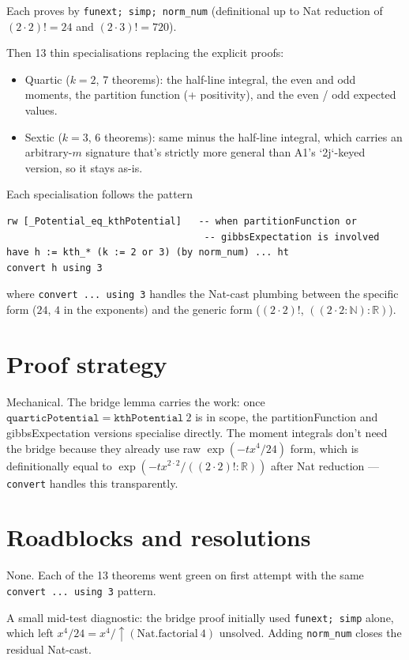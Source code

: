 \documentclass[11pt]{article}
\begin{document}
Each proves by \texttt{funext; simp; norm\_num} (definitional up to
Nat reduction of $(2 \cdot 2)! = 24$ and $(2 \cdot 3)! = 720$).

Then 13 thin specialisations replacing the explicit proofs:

\begin{itemize}[leftmargin=1.5em]
\item Quartic ($k = 2$, 7 theorems): the half-line integral, the
  even and odd moments, the partition function (+ positivity), and
  the even / odd expected values.
\item Sextic ($k = 3$, 6 theorems): same minus the half-line
  integral, which carries an arbitrary-$m$ signature that's strictly
  more general than A1's `2j`-keyed version, so it stays as-is.
\end{itemize}

Each specialisation follows the pattern
\begin{verbatim}
rw [_Potential_eq_kthPotential]   -- when partitionFunction or
                                   -- gibbsExpectation is involved
have h := kth_* (k := 2 or 3) (by norm_num) ... ht
convert h using 3
\end{verbatim}
where \texttt{convert ... using 3} handles the Nat-cast plumbing
between the specific form ($24$, $4$ in the exponents) and the
generic form ($(2 \cdot 2)!$, $((2 \cdot 2 : \mathbb N) : \mathbb R)$).

\section{Proof strategy}

Mechanical. The bridge lemma carries the work: once
$\texttt{quarticPotential} = \texttt{kthPotential}\ 2$ is in scope,
the partitionFunction and gibbsExpectation versions specialise
directly. The moment integrals don't need the bridge because they
already use raw $\exp(-tx^4/24)$ form, which is definitionally equal
to $\exp(-tx^{2 \cdot 2}/((2 \cdot 2)!:\mathbb R))$ after Nat
reduction --- \texttt{convert} handles this transparently.

\section{Roadblocks and resolutions}

None. Each of the 13 theorems went green on first attempt with the
same \texttt{convert ... using 3} pattern.

A small mid-test diagnostic: the bridge proof initially used
\texttt{funext; simp} alone, which left
$x^4 / 24 = x^4 / \uparrow\!(\textrm{Nat.factorial}\ 4)$
unsolved. Adding \texttt{norm\_num} closes the residual Nat-cast.
\end{document}
